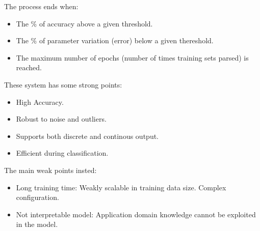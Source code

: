 \documentclass[12pt]{article}
\begin{document}
The process ends when:
\begin{itemize}
  \item The \% of accuracy above a given threshold.
  \item The \% of parameter variation (error) below a given thereshold.
  \item The maximum number of epochs (number of times training sets parsed) is reached.
\end{itemize}
These system has some strong points:
\begin{itemize}
  \item High Accuracy.
  \item Robust to noise and outliers.
  \item Supports both discrete and continous output.
  \item Efficient during classification.
\end{itemize}
The main weak points insted:
\begin{itemize}
  \item Long training time: Weakly scalable in training data size. Complex configuration.
  \item Not interpretable model: Application domain knowledge cannot be exploited in the model.
\end{itemize}
\end{document}
